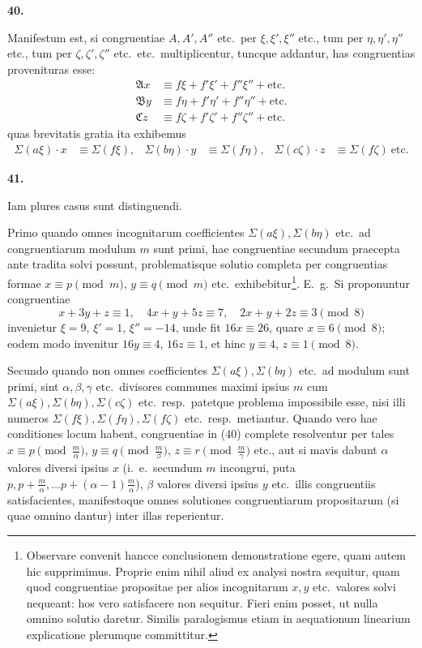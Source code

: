 \documentclass[12pt,a4paper]{article}
\theoremstyle{plain}
\theoremstyle{definition}
\theoremstyle{remark}
\begin{document}
\textbf{40.}

Manifestum est, si congruentiae $A, A', A''$ etc.\ per $\xi, \xi', \xi''$ etc., tum per $\eta, \eta', \eta''$ etc., tum per $\zeta, \zeta', \zeta''$ etc.\ etc.\ multiplicentur, tuncque addantur, has congruentias provenituras esse:
\begin{align*}
\mathfrak{A}x &\equiv f\xi + f'\xi' + f''\xi'' + \text{etc.} \\
\mathfrak{B}y &\equiv f\eta + f'\eta' + f''\eta'' + \text{etc.} \\
\mathfrak{C}z &\equiv f\zeta + f'\zeta' + f''\zeta'' + \text{etc.}
\end{align*}
quas brevitatis gratia ita exhibemus
\begin{align*}
\Sigma(a\xi) \cdot x &\equiv \Sigma(f\xi), & \Sigma(b\eta) \cdot y &\equiv \Sigma(f\eta), & \Sigma(c\zeta) \cdot z &\equiv \Sigma(f\zeta)\ \text{etc.}
\end{align*}

\textbf{41.}

Iam plures casus sunt distinguendi.

Primo quando omnes incognitarum coefficientes $\Sigma(a\xi), \Sigma(b\eta)$ etc.\ ad congruentiarum modulum $m$ sunt primi, hae congruentiae secundum praecepta ante tradita solvi possunt, problematisque solutio completa per congruentias formae $x \equiv p \pmod{m}$, $y \equiv q \pmod{m}$ etc.\ exhibebitur\footnote{Observare convenit hancce conclusionem demonstratione egere, quam autem hic supprimimus. Proprie enim nihil aliud ex analysi nostra sequitur, quam quod congruentiae propositae per alios incognitarum $x, y$ etc.\ valores solvi nequeant: hos vero satisfacere non sequitur. Fieri enim posset, ut nulla omnino solutio daretur. Similis paralogismus etiam in aequationum linearium explicatione plerumque committitur.}. E.~g.\ Si proponuntur congruentiae
\[
x + 3y + z \equiv 1,\quad 4x + y + 5z \equiv 7,\quad 2x + y + 2z \equiv 3 \pmod{8}
\]
invenietur $\xi = 9$, $\xi' = 1$, $\xi'' = -14$, unde fit $16x \equiv 26$, quare $x \equiv 6 \pmod{8}$; eodem modo invenitur $16y \equiv 4$, $16z \equiv 1$, et hinc $y \equiv 4$, $z \equiv 1 \pmod{8}$.

Secundo quando non omnes coefficientes $\Sigma(a\xi), \Sigma(b\eta)$ etc.\ ad modulum sunt primi, sint $\alpha, \beta, \gamma$ etc.\ divisores communes maximi ipsius $m$ cum $\Sigma(a\xi), \Sigma(b\eta), \Sigma(c\zeta)$ etc.\ resp.\ patetque problema impossibile esse, nisi illi numeros $\Sigma(f\xi), \Sigma(f\eta), \Sigma(f\zeta)$ etc.\ resp.\ metiantur. Quando vero hae conditiones locum habent, congruentiae in (40) complete resolventur per tales $x \equiv p \pmod{\frac{m}{\alpha}}$, $y \equiv q \pmod{\frac{m}{\beta}}$, $z \equiv r \pmod{\frac{m}{\gamma}}$ etc., aut si mavis dabunt $\alpha$ valores diversi ipsius $x$ (i.~e.\ secundum $m$ incongrui, puta $p, p + \frac{m}{\alpha}, \ldots p + (\alpha - 1)\frac{m}{\alpha}$), $\beta$ valores diversi ipsius $y$ etc.\ illis congruentiis satisfacientes, manifestoque omnes solutiones congruentiarum propositarum (si quae omnino dantur) inter illas reperientur.
\end{document}
